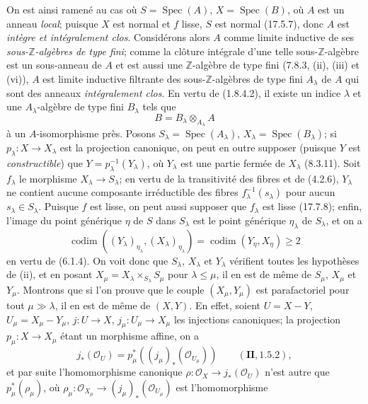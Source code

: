 On est ainsi ramené au cas où $S=\operatorname{Spec}(A)$,
$X=\operatorname{Spec}(B)$, où $A$ est un anneau \emph{local}; puisque $X$ est
normal et $f$ lisse, $S$ est normal (17.5.7), donc $A$ est \emph{intègre et
intégralement clos}. Considérons alors $A$ comme limite inductive de ses
\emph{sous-$\mathbb Z$-algèbres de type fini}; comme la clôture intégrale d'une telle
sous-$\mathbb Z$-algèbre est un sous-anneau de $A$ et est aussi une
$\mathbb Z$-algèbre de type fini (7.8.3, (ii), (iii) et (vi)), $A$ est limite inductive
filtrante des sous-$\mathbb Z$-algèbres de type fini $A_\lambda$ de $A$ qui sont des
anneaux \emph{intégralement clos}. En vertu de (1.8.4.2), il existe un indice
$\lambda$ et une $A_\lambda$-algèbre de type fini $B_\lambda$ tels que
\[
  B=B_\lambda\otimes_{A_\lambda}A
\]
à un $A$-isomorphisme près. Posons $S_\lambda=\operatorname{Spec}(A_\lambda)$,
$X_\lambda=\operatorname{Spec}(B_\lambda)$; si $p_\lambda:X\to X_\lambda$ est la
projection canonique, on peut en outre supposer (puisque $Y$ est
\emph{constructible}) que $Y=p_\lambda^{-1}(Y_\lambda)$, où $Y_\lambda$ est une
partie fermée de $X_\lambda$ (8.3.11). Soit $f_\lambda$ le morphisme
$X_\lambda\to S_\lambda$; en vertu de la transitivité des fibres et de (4.2.6),
$Y_\lambda$ ne contient aucune composante irréductible des fibres
$f_\lambda^{-1}(s_\lambda)$ pour aucun $s_\lambda\in S_\lambda$. Puisque $f$ est
lisse, on peut aussi supposer que $f_\lambda$ est lisse (17.7.8); enfin, l'image du
point générique $\eta$ de $S$ dans $S_\lambda$ est le point générique $\eta_\lambda$
de $S_\lambda$, et on a
\[
  \operatorname{codim}((Y_\lambda)_{\eta_\lambda},
  (X_\lambda)_{\eta_\lambda})
  =\operatorname{codim}(Y_\eta,X_\eta)\geq2
\]
en vertu de (6.1.4). On voit donc que $S_\lambda$, $X_\lambda$ et $Y_\lambda$
vérifient toutes les hypothèses de (ii), et en posant
$X_\mu=X_\lambda\times_{S_\lambda}S_\mu$ pour $\lambda\leq\mu$, il en est de même de
$S_\mu$, $X_\mu$ et $Y_\mu$. Montrons que si l'on prouve que le couple
$(X_\mu,Y_\mu)$ est parafactoriel pour tout $\mu\gg\lambda$, il en est de même de
$(X,Y)$. En effet, soient $U=X-Y$, $U_\mu=X_\mu-Y_\mu$, $j:U\to X$,
$j_\mu:U_\mu\to X_\mu$ les injections canoniques; la projection
$p_\mu:X\to X_\mu$ étant un morphisme affine, on a
\[
  j_*(\mathcal O_U)=p_\mu^*((j_\mu)_*(\mathcal O_{U_\mu}))
  \qquad(\mathbf{II}, 1.5.2),
\]
et par suite l'homomorphisme canonique
$\rho:\mathcal O_X\to j_*(\mathcal O_U)$ n'est autre que $p_\mu^*(\rho_\mu)$, où
$\rho_\mu:\mathcal O_{X_\mu}\to(j_\mu)_*(\mathcal O_{U_\mu})$ est l'homomorphisme
